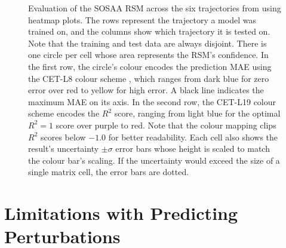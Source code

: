 \begin{figure}[H]
    \caption[Evaluation of the SOSAA RSM across Six Trajectories]{Evaluation of the SOSAA RSM across the six trajectories from  using heatmap plots. The rows represent the trajectory a model was trained on, and the columns show which trajectory it is tested on. Note that the training and test data are always disjoint. There is one circle per cell whose area represents the RSM's confidence. In the first row, the circle's colour encodes the prediction MAE using the CET-L8 colour scheme \cite{color-cet-2015, color-cet-2023}, which ranges from dark blue for zero error over red to yellow for high error. A black line indicates the maximum MAE on its axis. In the second row, the CET-L19 colour scheme \cite{color-cet-2015, color-cet-2023} encodes the $R^2$ score, ranging from light blue for the optimal $R^2 = 1$ score over purple to red. Note that the colour mapping clips $R^2$ scores below $-1.0$ for better readability. Each cell also shows the result's uncertainty $\pm \sigma$ error bars whose height is scaled to match the colour bar's scaling. If the uncertainty would exceed the size of a single matrix cell, the error bars are dotted.}
    \label{fig:sosaa-rsm-trajectories}
\end{figure}

\section{Limitations with Predicting Perturbations} \label{txt:perturbation-generalisation}

